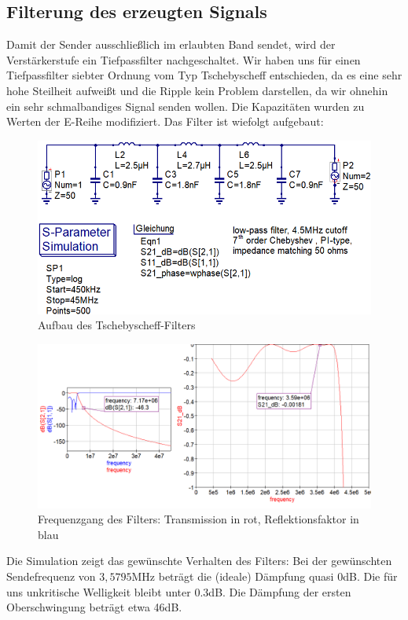 \subsection{Filterung des erzeugten Signals}
Damit der Sender ausschließlich im erlaubten Band sendet, wird der Verstärkerstufe
ein Tiefpassfilter nachgeschaltet. Wir haben uns für einen Tiefpassfilter siebter
Ordnung vom Typ Tschebyscheff entschieden, da es eine sehr hohe Steilheit aufweißt
und die Ripple kein Problem darstellen, da wir ohnehin ein sehr schmalbandiges
Signal senden wollen. Die Kapazitäten wurden zu Werten der E-Reihe modifiziert. Das Filter ist wiefolgt aufgebaut:
\begin{figure}[H]
\includegraphics{res/TP_Schaltplan.png}
\caption{Aufbau des Tschebyscheff-Filters}
\end{figure}

\begin{figure}[H]
\includegraphics[scale=0.6]{res/TP_Simulation.png}
\caption{Frequenzgang des Filters: Transmission in rot, Reflektionsfaktor in blau}
\end{figure}
Die Simulation zeigt das gewünschte Verhalten des Filters: Bei der gewünschten
Sendefrequenz von $3,5795$MHz beträgt die (ideale) Dämpfung quasi $0$dB.
Die für uns unkritische Welligkeit bleibt unter $0.3$dB.
Die Dämpfung der ersten Oberschwingung beträgt etwa 46dB.


